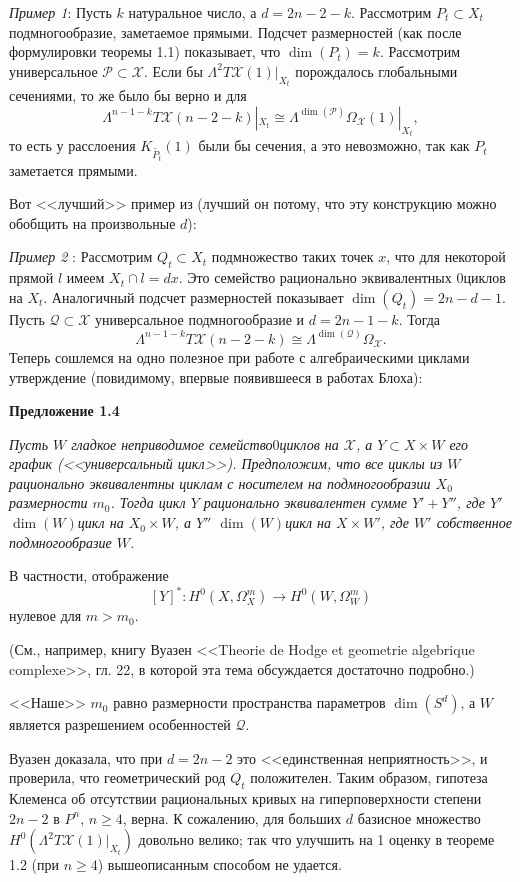 \medskip
{\it Пример 1}:
Пусть $k$ натуральное число, а $d=2n-2-k$. Рассмотрим
$P_t\subset X_t$ подмногообразие, заметаемое прямыми. Подсчет размерностей
(как после формулировки теоремы 1.1)
показывает, что $\dim(P_t)=k$. Рассмотрим универсальное
$\mathcal{P}\subset \mathcal{X}$. Если бы $\Lambda^2T\mathcal{X}(1)|_{X_t}$ порождалось
глобальными сечениями, то же было бы верно и для
$$
\Lambda^{n-1-k}T\mathcal{X}(n-2-k)|_{X_t}\cong
\Lambda^{\dim(\mathcal{P})}\Omega_\mathcal{X}(1)|_{X_t},
$$
то есть у расслоения $K_{\tilde{P_t}}(1)$ были бы сечения, а это невозможно,
так как $P_t$ заметается прямыми.


\medskip
Вот <<лучший>> пример из (лучший он потому, что эту конструкцию
можно обобщить на произвольные $d$):

\medskip
{\it Пример 2 }:
Рассмотрим $Q_t\subset X_t$ подмножество таких точек $x$,
что для некоторой прямой $l$ имеем $X_t\cap l=dx$. Это семейство рационально
эквивалентных $0$циклов на $X_t$. Аналогичный подсчет размерностей показывает
$\dim(Q_t)=2n-d-1$. Пусть $\mathcal{Q}\subset \mathcal{X}$
универсальное подмногообразие и $d=2n-1-k$. Тогда
$$
\Lambda^{n-1-k}T\mathcal{X}(n-2-k)\cong
\Lambda^{\dim(\mathcal{Q})}\Omega_\mathcal{X}.
$$
Теперь сошлемся на одно полезное при работе с алгебраическими циклами
утверждение
(повидимому, впервые появившееся в работах Блоха):

\medskip
{\bf Предложение 1.4}
{\it
Пусть $W$ гладкое неприводимое семейство\linebreak $0$циклов
на $\mathcal{X}$, а $Y\subset X\times W$
его график
\textup(<<универсальный цикл>>\textup). Предположим, что все циклы из $W$ рационально
эквивалентны циклам с носителем на подмногообразии $X_0$ размерности $m_0$.
Тогда цикл $Y$ рационально эквивалентен сумме $Y'+Y''$, где $Y'$
$\dim(W)$цикл на $X_0\times W$, а $Y''$
$\dim(W)$цикл на $X\times W'$, где $W'$ собственное подмногообразие $W$.

В частности,  отображение
$$
[Y]^*\colon H^0(X, \Omega_X^m)\rightarrow H^0(W, \Omega_W^m)
$$
нулевое для $m>m_0$.
}


\medskip
(См., например, книгу Вуазен <<Theorie de Hodge et geometrie algebrique
complexe>>, гл. 22, в которой эта тема обсуждается достаточно подробно.)


<<Наше>> $m_0$ равно размерности пространства параметров $\dim(S^d)$, а
 $W$ является разрешением особенностей $\mathcal{Q}$.

Вуазен доказала, что при $d=2n-2$ это <<единственная неприятность>>,
и проверила, что геометрический род $Q_t$ положителен. Таким образом,
гипотеза Клеменса об отсутствии рациональных кривых на гиперповерхности
степени $2n-2$ в $P^n$, $n\geq 4$, верна. К сожалению, для больших $d$
базисное множество $H^0(\Lambda^2T\mathcal{X}(1)|_{X_t})$ довольно велико;
так что улучшить на 1 оценку в теореме 1.2 (при $n\geq 4$)
вышеописанным способом не удается.



